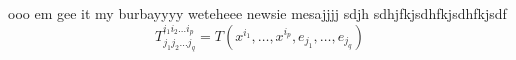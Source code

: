 \documentclass{article}
\begin{document}
ooo em gee it my burbayyyy weteheee
newsie mesajjjj
sdjh
sdhjfkjsdhfkjsdhfkjsdf
\[ T^{i_1 i_2 \dots i_p}_{j_1 j_2 \dots j_q} = T(x^{i_1},\dots,x^{i_p},e_{j_1},\dots,e_{j_q}) \]
\end{document}
